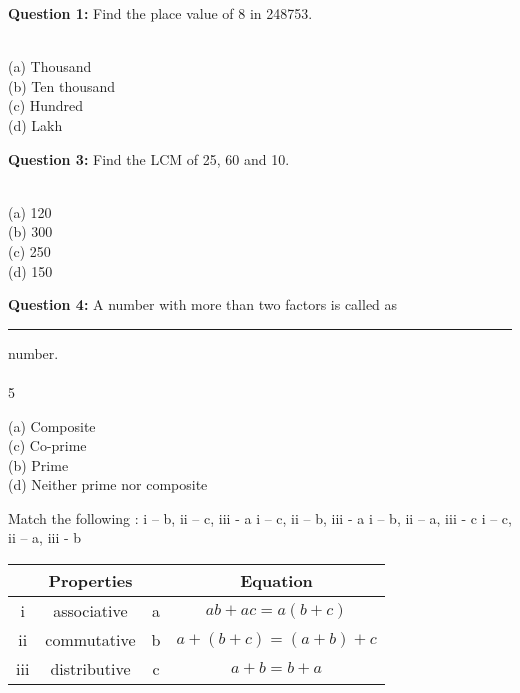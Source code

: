 \documentclass[12pt, a4paper]{article}
\newcommand{\questionsection}[3]{
\vspace{1.5mm}
\begin{center}
    \textbf{\large \underline{SECTION - #1}}\\
{\small \textbf{#2}}
\end{center}
{\small 
\textit{\begin{itemize}[noitemsep, topsep=0pt]
    #3
\end{itemize}}}}
\newcommand{\mcqfourfour}[9]{
\vspace{2.5mm}
\begin{raggedright}
\textbf{Question #1:} #2 \hfill \textit{#7}\\
\textit{#8}\\
#9
\begin{multicols}{4}{}
(a) #3\\
\columnbreak
(b) #4\\
\columnbreak
(c) #5\\
\columnbreak
(d) #6\\
\end{multicols}
\end{raggedright}}
\newcommand{\mcqfourtwo}[9]{
\vspace{2.5mm}
\begin{raggedright}
\textbf{Question #1:} #2 \hfill \textit{#7}\\
\textit{#8}\\
#9
\begin{multicols}{2}{}
(a) #3\\
(c) #5\\
\columnbreak
(b) #4\\
(d) #6\\
\end{multicols}
\end{raggedright}}
\newcommand{\mcqfourfour}[9]{
\vspace{1.5mm}
\begin{raggedright}
\textbf{Question #1:} #2 \hfill \textit{#7}\\
\textit{#8}\\
#9
\begin{multicols}{4}{}
\begin{enumerate}
\item(a) #3\\
\columnbreak
\item(b) #4\\
\columnbreak
\item(c) #5\\
\columnbreak
\item(d) #6\\
\ewn{enumerate}
\end{multicols}
\end{raggedright}}
\begin{document}




\mcqfourfour{1}{Find the place value of 8 in 248753.}
{Thousand}
{Ten thousand}
{Hundred}
{Lakh}
{ }{}{}


 

\mcqfourfour{3}{Find the LCM of 25, 60 and 10.}
{120}
{300}
{250}
{150}
{ }{}{}

\mcqfourtwo{4}{A number with more than two factors is called as \rule{60}{0.5} number.}
{Composite}
{Prime}
{Co-prime}
{Neither prime nor composite}
{ }

\mcqfourtwo{5}{Match the following :}
{i – b, ii – c, iii - a}
{i – c, ii – b, iii - a}
{ i – b, ii – a, iii - c}
{i – c, ii – a, iii - b}
{ }{}{\begin{tabular}{|c|c||c|c|}
    \hline
        &   Properties  &   & Equation\\
    \hline
    i   &  associative  &  a & $a b+a c=a(b+c)$\\
    \hline
    ii   & commutative  &  b & $a+(b+c)=(a+b)+c$\\
    \hline
    iii   & distributive  & c  & $a+b=b+a$\\
    \hline
\end{tabular}}
\end{document}
